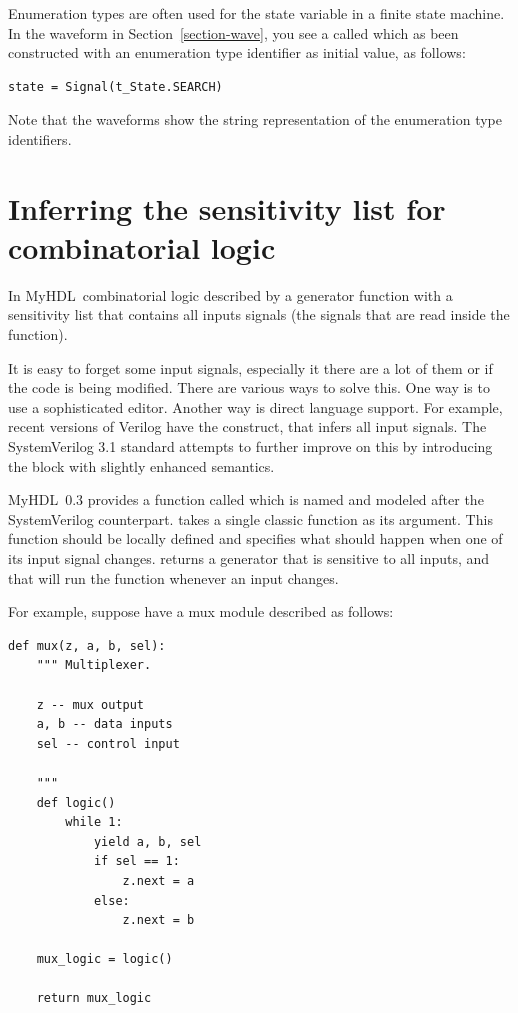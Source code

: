 \documentclass{howto}
\newcommand{\myhdl}{\protect \mbox{MyHDL}}
\begin{document}
Enumeration types are often used for the state variable in a finite
state machine.  In the waveform in Section~\ref{section-wave}, you see
a  called  which as been constructed with an
enumeration type identifier as initial value, as follows:

\begin{verbatim}
state = Signal(t_State.SEARCH)
\end{verbatim}

Note that the waveforms show the string representation of the
enumeration type identifiers. 


\section{Inferring the sensitivity list for combinatorial
logic\label{section-combinatorial}}

In \myhdl\, combinatorial logic described by a generator function with
a sensitivity list that contains all inputs signals (the signals that
are read inside the function).

It is easy to forget some input signals, especially it there are a lot
of them or if the code is being modified. There are various ways to
solve this. One way is to use a sophisticated editor. Another way is
direct language support. For example, recent versions of Verilog have
the  construct, that infers all input signals. The
SystemVerilog 3.1 standard attempts to further improve on this by
introducing the  block with slightly enhanced
semantics.

\myhdl\ 0.3 provides a function called  which
is named and modeled after the SystemVerilog counterpart.
 takes a single classic function as its
argument. This function should be locally defined and specifies what
should happen when one of its input signal
changes.  returns a generator that is
sensitive to all inputs, and that will run the function whenever an
input changes.

For example, suppose have a mux module described as follows:

\begin{verbatim}
def mux(z, a, b, sel):
    """ Multiplexer.
    
    z -- mux output
    a, b -- data inputs
    sel -- control input

    """
    def logic()
        while 1:
            yield a, b, sel
            if sel == 1:
                z.next = a
            else:
                z.next = b

    mux_logic = logic()

    return mux_logic
\end{verbatim}
\end{document}
